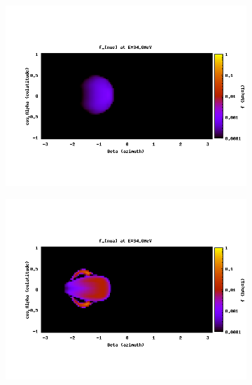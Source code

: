 \begin{figure}
  \centering
  \begin{subfigure}{.3\textwidth}
    \centering
    \includegraphics[width=1\linewidth]{Figures/f_nue-E-34MeV}
  \end{subfigure}
  \begin{subfigure}{.3\textwidth}
    \centering
    \includegraphics[width=1\linewidth]{Figures/f_nua-E-34MeV}
  \end{subfigure}
  \begin{subfigure}{.3\textwidth}
    \centering

\end{subfigure}
\end{figure}
